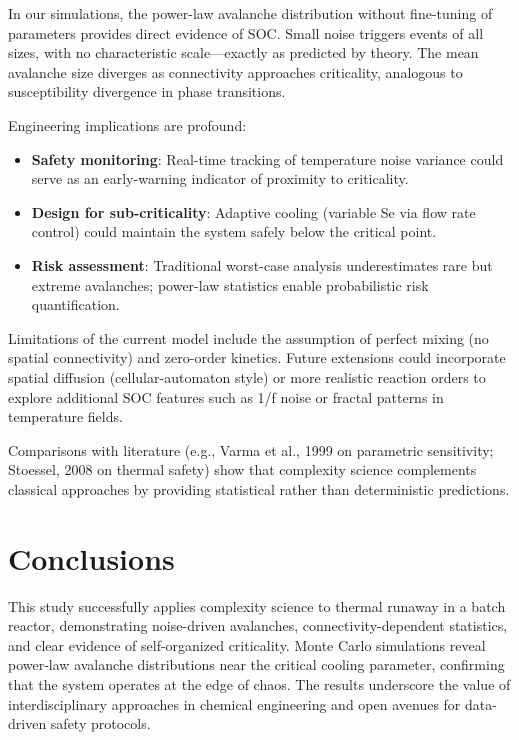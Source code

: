 \documentclass[11pt,a4paper]{article}
\begin{document}
In our simulations, the power-law avalanche distribution without fine-tuning of parameters provides direct evidence of SOC. Small noise triggers events of all sizes, with no characteristic scale—exactly as predicted by theory. The mean avalanche size diverges as connectivity approaches criticality, analogous to susceptibility divergence in phase transitions.

Engineering implications are profound:
\begin{itemize}
\item \textbf{Safety monitoring}: Real-time tracking of temperature noise variance could serve as an early-warning indicator of proximity to criticality.
\item \textbf{Design for sub-criticality}: Adaptive cooling (variable Se via flow rate control) could maintain the system safely below the critical point.
\item \textbf{Risk assessment}: Traditional worst-case analysis underestimates rare but extreme avalanches; power-law statistics enable probabilistic risk quantification.
\end{itemize}

Limitations of the current model include the assumption of perfect mixing (no spatial connectivity) and zero-order kinetics. Future extensions could incorporate spatial diffusion (cellular-automaton style) or more realistic reaction orders to explore additional SOC features such as 1/f noise or fractal patterns in temperature fields.

Comparisons with literature (e.g., Varma et al., 1999 on parametric sensitivity; Stoessel, 2008 on thermal safety) show that complexity science complements classical approaches by providing statistical rather than deterministic predictions.

\section{Conclusions}
\label{sec:conclusions}

This study successfully applies complexity science to thermal runaway in a batch reactor, demonstrating noise-driven avalanches, connectivity-dependent statistics, and clear evidence of self-organized criticality. Monte Carlo simulations reveal power-law avalanche distributions near the critical cooling parameter, confirming that the system operates at the edge of chaos. The results underscore the value of interdisciplinary approaches in chemical engineering and open avenues for data-driven safety protocols.
\end{document}
